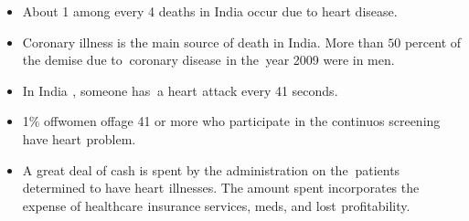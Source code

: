 \documentclass[oneside,12pt]{Classes/VTU}
\begin{document}
    \pagebreak
    \begin{itemize}
    	\item About 1 among every 4 deaths in India occur due to heart disease.
	    \item Coronary illness is the main source of death in India. More than $50$ percent of the demise due to\tiny\textcolor{white}{o}\normalsize coronary disease\tiny\textcolor{white}{s}\normalsize in the\tiny\textcolor{white}{n}\normalsize year 2009 were in men.
    	\item In India\tiny\textcolor{white}{s}\normalsize, someone has\tiny\textcolor{white}{h}\normalsize a heart\tiny\textcolor{white}{s}\normalsize attack every 41 seconds.
    	\item 1\% of\tiny\textcolor{white}{f}\normalsize women of\tiny\textcolor{white}{f}\normalsize age 41 or more who participate\tiny\textcolor{white}{s}\normalsize in the continuos screening have heart\tiny\textcolor{white}{s}\normalsize problem.
    	\item A great deal of cash is spent by the administration on the\tiny\textcolor{white}{n}\normalsize patients determined to have heart\tiny\textcolor{white}{s}\normalsize illnesses. The amount spent incorporates the expense of healthcare\tiny\textcolor{white}{s}\normalsize insurance services, meds, and lost\tiny\textcolor{white}{s}\normalsize profitability.
    \end{itemize}
    
\end{document}
